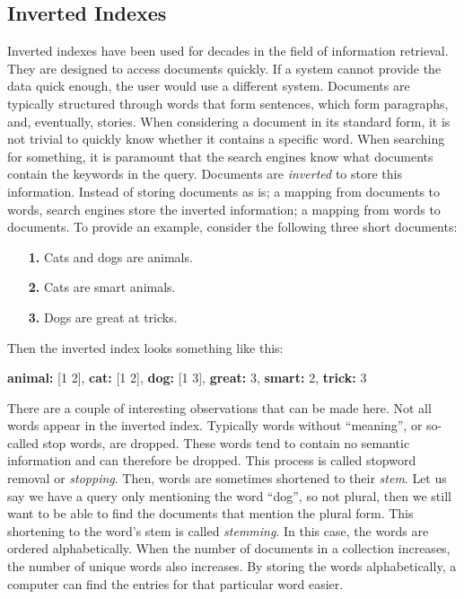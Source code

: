 \subsection{Inverted Indexes}
Inverted indexes have been used for decades in the field of information retrieval. They are designed to access documents quickly. If a system cannot provide the data quick enough, the user would use a different system. Documents are typically structured through words that form sentences, which form paragraphs, and, eventually, stories. When considering a document in its standard form, it is not trivial to quickly know whether it contains a specific word. When searching for something, it is paramount that the search engines know what documents contain the keywords in the query. Documents are \emph{inverted} to store this information. Instead of storing documents as is; a mapping from documents to words, search engines store the inverted information; a mapping from words to documents. To provide an example, consider the following three short documents:

\begin{itemize}
	\item[\textbf{1.}] Cats and dogs are animals.
	\item[\textbf{2.}] Cats are smart animals.
	\item[\textbf{3.}] Dogs are great at tricks. 
\end{itemize}
Then the inverted index looks something like this:

\medskip
\textbf{animal:} [1 2],
\textbf{cat:} [1 2], 
\textbf{dog:} [1 3],
\textbf{great:} 3,
\textbf{smart:} 2,
\textbf{trick:} 3
\medskip

\noindent There are a couple of interesting observations that can be made here. Not all words appear in the inverted index. Typically words without ``meaning'', or so-called stop words, are dropped. These words tend to contain no semantic information and can therefore be dropped. This process is called stopword removal or \emph{stopping}. Then, words are sometimes shortened to their \emph{stem}. Let us say we have a query only mentioning the word ``dog'', so not plural, then we still want to be able to find the documents that mention the plural form. This shortening to the word's stem is called \emph{stemming}. In this case, the words are ordered alphabetically. When the number of documents in a collection increases, the number of unique words also increases. By storing the words alphabetically, a computer can find the entries for that particular word easier. 

